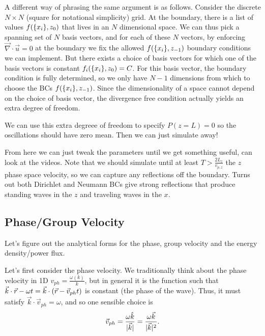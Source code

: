 \documentclass[11pt,
        usenames, %
        dvipsnames %
    ]{report}
\DeclarePairedDelimiter\abs{\lvert}{\rvert}
\DeclarePairedDelimiter\p{\lparen}{\rparen}
\DeclarePairedDelimiter\z{\lbrace}{\rbrace}
\begin{document}
A different way of phrasing the same argument is as follows. Consider the
discrete $N \times N$ (square for notational simplicity) grid. At the boundary,
there is a list of values $f\p*{\z*{x_i}, z_0}$ that lives in an $N$ dimensional
space. We can thus pick a spanning set of $N$ basis vectors, and for each of
these $N$ vectors, by enforcing $\vec{\nabla} \cdot \vec{u} = 0$ at the boundary
we fix the allowed $f\p*{\z*{x_i}, z_{-1}}$ boundary conditions we can implement.
But there exists a choice of basis vectors for which one of the basis vectors is
constant $f_i\p*{\z*{x_i}, z_0} = C$. For this basis vector, the boundary
condition is fully determined, so we only have $N - 1$ dimensions from which to
choose the BCs $f\p*{\z*{x_i}, z_{-1}}$. Since the dimensionality of a space
cannot depend on the choice of basis vector, the divergence free condition
actually yields an extra degree of freedom.

We can use this extra degreee of freedom to specify $P(z = L) = 0$ so the
oscillations should have zero mean. Then we can just simulate away!

From here we can just tweak the parameters until we get something useful, can
look at the videos. Note that we should simulate until at least $T >
\frac{2L_z}{v_{p, z}}$ the $z$ phase space velocity, so we can capture any
reflections off the boundary. Turns out both Dirichlet and Neumann BCs give
strong reflections that produce standing waves in the $z$ and traveling waves in
the $x$.

\subsection{Phase/Group Velocity}

Let's figure out the analytical forms for the phase, group velocity and the
energy density/power flux.

Let's first consider the phase velocity. We traditionally think about the phase
velocity in 1D $v_{ph} = \frac{\omega(k)}{k}$, but in general it is the function
such that $\vec{k} \cdot \vec{r} - \omega t = \vec{k} \cdot \p*{\vec{r} -
\vec{v}_{ph}t}$ is constant (the phase of the wave). Thus, it must satisfy
$\vec{k} \cdot \vec{v}_{ph} = \omega$, and so one sensible choice is
\begin{equation}
    \vec{v}_{ph} = \frac{\omega \hat{k}}{\abs{\vec{k}}}
        = \frac{\omega \vec{k}}{\abs{\vec{k}}^2}.
        \label{eq:v_ph}
\end{equation}
\end{document}
